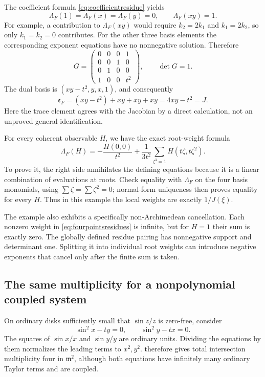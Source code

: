 \documentclass[11pt,oneside]{article}
\numberwithin{equation}{section}
\theoremstyle{definition}
\theoremstyle{remark}\newtheorem{remark}[theorem]{Remark}
\newcommand{\mm}{\mathfrak m}
\begin{document}
The coefficient formula \eqref{eq:coefficientresidue} yields
\[
 \Lambda_F(1)=\Lambda_F(x)=\Lambda_F(y)=0,
 \qquad \Lambda_F(xy)=1.
\]
For example, a contribution to \(\Lambda_F(xy)\) would require
\(k_2=2k_1\) and \(k_1=2k_2\), so only \(k_1=k_2=0\) contributes. For the other three basis elements the corresponding exponent equations have no nonnegative solution. Therefore
\begin{equation}\label{eq:fourpointsGram}
 G=\begin{pmatrix}
 0&0&0&1\\
 0&0&1&0\\
 0&1&0&0\\
 1&0&0&t^2
 \end{pmatrix},\qquad\det G=1.
\end{equation}
The dual basis is \((xy-t^2,y,x,1)\), and consequently
\[
 \mathfrak e_F=(xy-t^2)+xy+xy+xy=4xy-t^2=J.
\]
Here the trace element agrees with the Jacobian by a direct calculation, not an unproved general identification.

For every coherent observable \(H\), we have the exact root-weight formula
\begin{equation}\label{eq:fourpointsresidues}
 \boxed{\displaystyle
 \Lambda_F(H)=
 -\frac{H(0,0)}{t^2}
 +\frac1{3t^2}\sum_{\zeta^3=1}H(t\zeta,t\zeta^2).}
\end{equation}
To prove it, the right side annihilates the defining equations because it is a linear combination of evaluations at roots. Check equality with \(\Lambda_F\) on the four basis monomials, using \(\sum\zeta=\sum\zeta^2=0\); normal-form uniqueness then proves equality for every \(H\). Thus in this example the local weights are exactly \(1/J(\xi)\).

The example also exhibits a specifically non-Archimedean cancellation. Each nonzero weight in \eqref{eq:fourpointsresidues} is infinite, but for \(H=1\) their sum is exactly zero. The globally defined residue pairing has nonnegative support and determinant one. Splitting it into individual root weights can introduce negative exponents that cancel only after the finite sum is taken.

\subsection{The same multiplicity for a nonpolynomial coupled system}\label{subsec:sin}
On ordinary disks sufficiently small that \(\sin z/z\) is zero-free, consider
\begin{equation}\label{eq:sinsystem}
 \sin^2x-ty=0,\qquad \sin^2y-tx=0.
\end{equation}
The squares of \(\sin x/x\) and \(\sin y/y\) are ordinary units. Dividing the equations by them normalizes the leading terms to \(x^2,y^2\).  therefore gives total intersection multiplicity four in \(\mm^2\), although both equations have infinitely many ordinary Taylor terms and are coupled.
\end{document}
